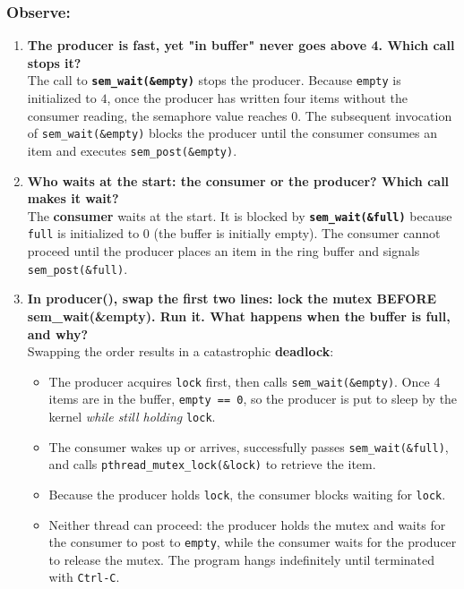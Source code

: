 \documentclass{labreport}
\begin{document}
\subsubsection*{Observe:}
\begin{enumerate}[leftmargin=*]
    \item \textbf{The producer is fast, yet "in buffer" never goes above 4. Which call stops it?}\\[0.2em]
    The call to \textbf{\texttt{sem\_wait(\&empty)}} stops the producer. Because \texttt{empty} is initialized to $4$, once the producer has written four items without the consumer reading, the semaphore value reaches $0$. The subsequent invocation of \texttt{sem\_wait(\&empty)} blocks the producer until the consumer consumes an item and executes \texttt{sem\_post(\&empty)}.

    \item \textbf{Who waits at the start: the consumer or the producer? Which call makes it wait?}\\[0.2em]
    The \textbf{consumer} waits at the start. It is blocked by \textbf{\texttt{sem\_wait(\&full)}} because \texttt{full} is initialized to $0$ (the buffer is initially empty). The consumer cannot proceed until the producer places an item in the ring buffer and signals \texttt{sem\_post(\&full)}.

    \item \textbf{In producer(), swap the first two lines: lock the mutex BEFORE sem\_wait(\&empty). Run it. What happens when the buffer is full, and why?}\\[0.2em]
    Swapping the order results in a catastrophic \textbf{deadlock}:
    \begin{itemize}[noitemsep]
        \item The producer acquires \texttt{lock} first, then calls \texttt{sem\_wait(\&empty)}. Once 4 items are in the buffer, \texttt{empty == 0}, so the producer is put to sleep by the kernel \emph{while still holding} \texttt{lock}.
        \item The consumer wakes up or arrives, successfully passes \texttt{sem\_wait(\&full)}, and calls \texttt{pthread\_mutex\_lock(\&lock)} to retrieve the item.
        \item Because the producer holds \texttt{lock}, the consumer blocks waiting for \texttt{lock}.
        \item Neither thread can proceed: the producer holds the mutex and waits for the consumer to post to \texttt{empty}, while the consumer waits for the producer to release the mutex. The program hangs indefinitely until terminated with \texttt{Ctrl-C}.
    \end{itemize}
\end{enumerate}
\end{document}
